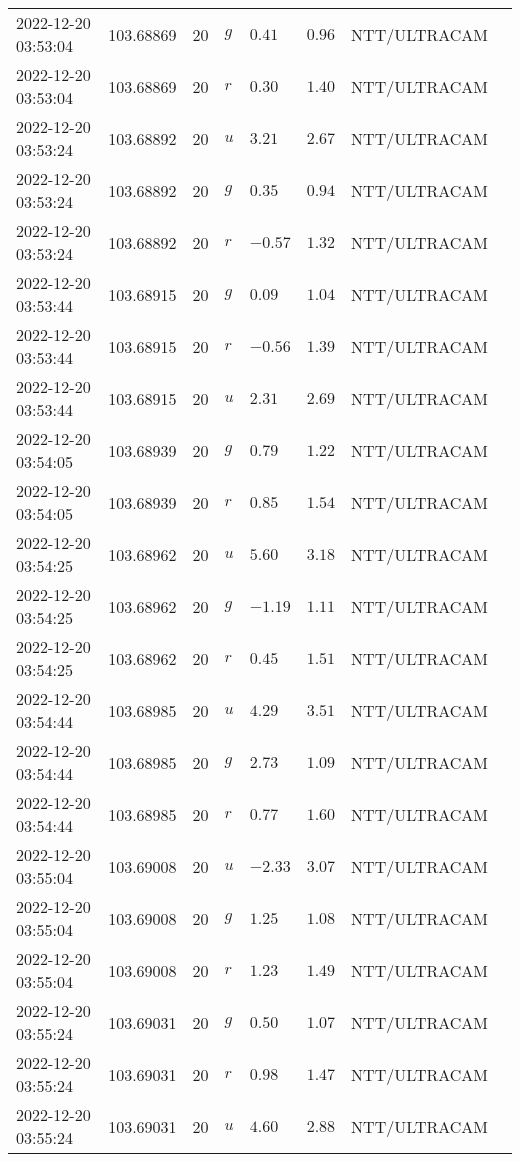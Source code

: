 \documentclass{nature_plusfigure}
\begin{document}
\begin{supplement}
\begin{center}
\begin{longtable}{llllllll}
2022-12-20 03:53:04 & 103.68869 & 20 & $g$ & $0.41$ & $0.96$ & NTT/ULTRACAM &  \\ 
2022-12-20 03:53:04 & 103.68869 & 20 & $r$ & $0.30$ & $1.40$ & NTT/ULTRACAM &  \\ 
2022-12-20 03:53:24 & 103.68892 & 20 & $u$ & $3.21$ & $2.67$ & NTT/ULTRACAM &  \\ 
2022-12-20 03:53:24 & 103.68892 & 20 & $g$ & $0.35$ & $0.94$ & NTT/ULTRACAM &  \\ 
2022-12-20 03:53:24 & 103.68892 & 20 & $r$ & $-0.57$ & $1.32$ & NTT/ULTRACAM &  \\ 
2022-12-20 03:53:44 & 103.68915 & 20 & $g$ & $0.09$ & $1.04$ & NTT/ULTRACAM &  \\ 
2022-12-20 03:53:44 & 103.68915 & 20 & $r$ & $-0.56$ & $1.39$ & NTT/ULTRACAM &  \\ 
2022-12-20 03:53:44 & 103.68915 & 20 & $u$ & $2.31$ & $2.69$ & NTT/ULTRACAM &  \\ 
2022-12-20 03:54:05 & 103.68939 & 20 & $g$ & $0.79$ & $1.22$ & NTT/ULTRACAM &  \\ 
2022-12-20 03:54:05 & 103.68939 & 20 & $r$ & $0.85$ & $1.54$ & NTT/ULTRACAM &  \\ 
2022-12-20 03:54:25 & 103.68962 & 20 & $u$ & $5.60$ & $3.18$ & NTT/ULTRACAM &  \\ 
2022-12-20 03:54:25 & 103.68962 & 20 & $g$ & $-1.19$ & $1.11$ & NTT/ULTRACAM &  \\ 
2022-12-20 03:54:25 & 103.68962 & 20 & $r$ & $0.45$ & $1.51$ & NTT/ULTRACAM &  \\ 
2022-12-20 03:54:44 & 103.68985 & 20 & $u$ & $4.29$ & $3.51$ & NTT/ULTRACAM &  \\ 
2022-12-20 03:54:44 & 103.68985 & 20 & $g$ & $2.73$ & $1.09$ & NTT/ULTRACAM &  \\ 
2022-12-20 03:54:44 & 103.68985 & 20 & $r$ & $0.77$ & $1.60$ & NTT/ULTRACAM &  \\ 
2022-12-20 03:55:04 & 103.69008 & 20 & $u$ & $-2.33$ & $3.07$ & NTT/ULTRACAM &  \\ 
2022-12-20 03:55:04 & 103.69008 & 20 & $g$ & $1.25$ & $1.08$ & NTT/ULTRACAM &  \\ 
2022-12-20 03:55:04 & 103.69008 & 20 & $r$ & $1.23$ & $1.49$ & NTT/ULTRACAM &  \\ 
2022-12-20 03:55:24 & 103.69031 & 20 & $g$ & $0.50$ & $1.07$ & NTT/ULTRACAM &  \\ 
2022-12-20 03:55:24 & 103.69031 & 20 & $r$ & $0.98$ & $1.47$ & NTT/ULTRACAM &  \\ 
2022-12-20 03:55:24 & 103.69031 & 20 & $u$ & $4.60$ & $2.88$ & NTT/ULTRACAM &  \\ 

\end{longtable}
\end{center}
\end{supplement}
\end{document}

